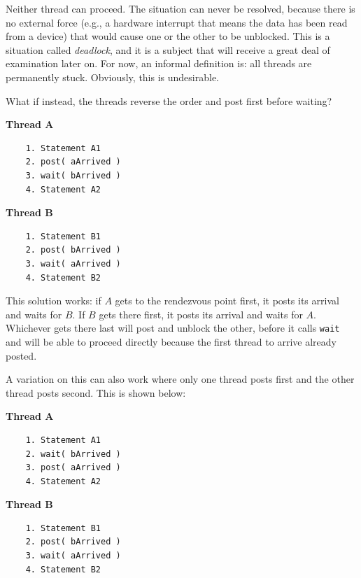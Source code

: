 Neither thread can proceed. The situation can never be resolved, because there is no external force (e.g., a hardware interrupt that means the data has been read from a device) that would cause one or the other to be unblocked. This is a situation called \textit{deadlock}, and it is a subject that will receive a great deal of examination later on. For now, an informal definition is: all threads are permanently stuck. Obviously, this is undesirable.

What if instead, the threads reverse the order and post first before waiting?

\begin{multicols}{2}
	\textbf{Thread A}\vspace{-2em}
	\begin{verbatim}
	1. Statement A1
	2. post( aArrived )
	3. wait( bArrived )
	4. Statement A2
  \end{verbatim}
	\columnbreak
	\textbf{Thread B}\vspace{-2em}
	\begin{verbatim}
	1. Statement B1
	2. post( bArrived )
	3. wait( aArrived )
	4. Statement B2
  \end{verbatim}
\end{multicols}
\vspace{-2em}

This solution works: if $A$ gets to the rendezvous point first, it posts its arrival and waits for $B$. If $B$ gets there first, it posts its arrival and waits for $A$. Whichever gets there last will post and unblock the other, before it calls \texttt{wait} and will be able to proceed directly because the first thread to arrive already posted.

A variation on this can also work where only one thread posts first and the other thread posts second. This is shown below:

\begin{multicols}{2}
	\textbf{Thread A}\vspace{-2em}
	\begin{verbatim}
	1. Statement A1
	2. wait( bArrived )
	3. post( aArrived )
	4. Statement A2
  \end{verbatim}
	\columnbreak
	\textbf{Thread B}\vspace{-2em}
	\begin{verbatim}
	1. Statement B1
	2. post( bArrived )
	3. wait( aArrived )
	4. Statement B2
  \end{verbatim}
\end{multicols}
\vspace{-2em}

